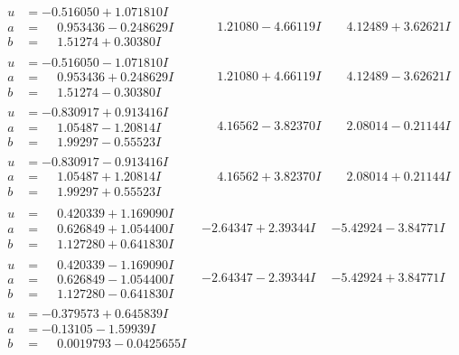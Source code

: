 \documentclass[1p]{elsarticle_modified}
\theoremstyle{definition}
\begin{document}
$$\begin{array}{c|c|c}
\begin{aligned}
u &= -0.516050 + 1.071810 I \\
a &= \phantom{-}0.953436 - 0.248629 I \\
b &= \phantom{-}1.51274 + 0.30380 I\end{aligned}
 & \phantom{-}1.21080 - 4.66119 I & \phantom{-}4.12489 + 3.62621 I \\ \hline\begin{aligned}
u &= -0.516050 - 1.071810 I \\
a &= \phantom{-}0.953436 + 0.248629 I \\
b &= \phantom{-}1.51274 - 0.30380 I\end{aligned}
 & \phantom{-}1.21080 + 4.66119 I & \phantom{-}4.12489 - 3.62621 I \\ \hline\begin{aligned}
u &= -0.830917 + 0.913416 I \\
a &= \phantom{-}1.05487 - 1.20814 I \\
b &= \phantom{-}1.99297 - 0.55523 I\end{aligned}
 & \phantom{-}4.16562 - 3.82370 I & \phantom{-}2.08014 - 0.21144 I \\ \hline\begin{aligned}
u &= -0.830917 - 0.913416 I \\
a &= \phantom{-}1.05487 + 1.20814 I \\
b &= \phantom{-}1.99297 + 0.55523 I\end{aligned}
 & \phantom{-}4.16562 + 3.82370 I & \phantom{-}2.08014 + 0.21144 I \\ \hline\begin{aligned}
u &= \phantom{-}0.420339 + 1.169090 I \\
a &= \phantom{-}0.626849 + 1.054400 I \\
b &= \phantom{-}1.127280 + 0.641830 I\end{aligned}
 & -2.64347 + 2.39344 I & -5.42924 - 3.84771 I \\ \hline\begin{aligned}
u &= \phantom{-}0.420339 - 1.169090 I \\
a &= \phantom{-}0.626849 - 1.054400 I \\
b &= \phantom{-}1.127280 - 0.641830 I\end{aligned}
 & -2.64347 - 2.39344 I & -5.42924 + 3.84771 I \\ \hline\begin{aligned}
u &= -0.379573 + 0.645839 I \\
a &= -0.13105 - 1.59939 I \\
b &= \phantom{-}0.0019793 - 0.0425655 I\end{aligned}

\end{array}$$
\end{document}
